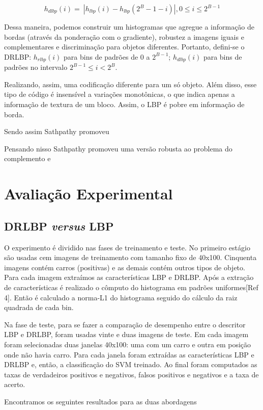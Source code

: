 \documentclass[a4paper,twocolumn]{article}
\begin{document}
\begin{equation}
    \label{eq:target_cost}
    h_{dlbp}(i) = \displaystyle\ |h_{lbp}(i) - h_{lbp}(2^B - 1 - i)|, 0\leq i \leq 2^{B - 1}
\end{equation}

Dessa maneira, podemos construir um histogramas que agregue a informação de bordas (através da ponderação com o gradiente), robustez a imagens iguais e complementares e discriminação para objetos diferentes. Portanto, defini-se o DRLBP: $h_{rlbp}(i)$ para bins de padrões de 0 a $2^{B - 1}$; $h_{dlbp}(i)$ para bins de padrões no intervalo $2^{B-1} \leq i <2^B$.

Realizando, assim, uma codificação diferente para um só objeto. Além disso, esse tipo de código é insensível a variações monotônicas, o que indica apenas a informação de textura de um bloco. Assim, o LBP é pobre em informação de borda.

Sendo assim Sathpathy promoveu 

Pensando nisso Sathpathy promoveu uma versão robusta ao problema do complemento e 


\section{Avaliação Experimental}

\subsection{DRLBP \textit{versus} LBP}

O experimento é dividido nas fases de treinamento e teste. No primeiro estágio são usadas cem imagens de treinamento com tamanho fixo de 40x100. Cinquenta imagens contém carros (positivas) e as demais contém outros tipos de objeto. Para cada imagem extraímos as características LBP e DRLBP. Após a extração de características é realizado o cômputo do histograma em padrões uniformes[Ref 4]. Então é calculado a norma-L1 do histograma seguido do cálculo da raiz quadrada de cada bin.

Na fase de teste, para se fazer a comparação de desempenho entre o descritor LBP e DRLBP, foram usadas vinte e duas imagens de teste. Em cada imagem foram selecionadas duas janelas 40x100: uma com um carro e outra em posição onde não havia carro. Para cada janela foram extraídas as características LBP e DRLBP e, então, a classificação do SVM treinado. Ao final foram computados as taxas de verdadeiros positivos e negativos, falsos positivos e negativos e a taxa de acerto. 

Encontramos os seguintes resultados para as duas abordagens
\end{document}
